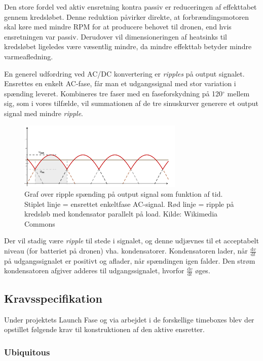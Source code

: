 Den store fordel ved aktiv ensretning kontra passiv er reduceringen af effekttabet gennem kredsløbet. Denne reduktion påvirker direkte, at forbrændingsmotoren skal køre med mindre RPM for at producere behovet til dronen, end hvis ensretningen var passiv. Derudover vil dimensioneringen af heatsinks til kredsløbet ligeledes være væsentlig mindre, da mindre effekttab betyder mindre varmeafledning.  
  
En generel udfordring ved AC/DC konvertering er \textit{ripples} på output signalet. Ensrettes en enkelt AC-fase, får man et udgangssignal med stor variation i spænding leveret. Kombineres tre faser med en faseforskydning på 120$^\circ$ mellem sig, som i vores tilfælde, vil summationen af de tre sinuskurver generere et output signal med mindre \textit{ripple}.

\begin{figure}[h]
  \centering
  \includegraphics[width=0.7\textwidth]{./figurer/prens2.png}
  \caption{Graf over ripple spænding på output signal som funktion af tid. Stiplet linje = ensrettet enkeltfase
AC-signal. Rød linje = ripple på kredsløb med kondensator parallelt på load. Kilde: Wikimedia Commons}
  \label{fig:prens2}
\end{figure}

Der vil stadig være \textit{ripple} til stede i signalet, og denne udjævnes til et acceptabelt niveau (for batteriet på dronen) vha. kondensatorer. Kondensatoren lader, når $\frac{\mathrm{d}v}{\mathrm{d}t}$ på udgangssignalet er positivt og aflader, når spændingen igen falder. Den strøm kondensatoren afgiver adderes til udgangssignalet, hvorfor $\frac{\mathrm{d}v}{\mathrm{d}t}$ øges.

\subsection{Kravsspecifikation}
\label{sec:kravsspecifikation-4}

Under projektets Launch Fase og via arbejdet i de forskellige timeboxes blev der opstillet følgende krav til konstruktionen af den aktive ensretter.

\subsubsection{Ubiquitous}
\label{sec:ubiquitous}

